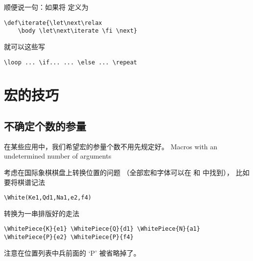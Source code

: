 \documentclass[letterpaper]{book}
\begin{document}
顺便说一句：如果将  定义为
\begin{verbatim}
\def\iterate{\let\next\relax 
    \body \let\next\iterate \fi \next}
\end{verbatim}
就可以这些写
\begin{verbatim}
\loop ... \if... ... \else ... \repeat
\end{verbatim}

\section{宏的技巧}

\subsection{不确定个数的参量}

在某些应用中，我们希望宏的参量个数不用先规定好。
\howto  Macros with an undetermined number
of arguments\par

考虑在国际象棋棋盘上转换位置的问题%
（全部宏和字体可以在 \cite{chess} 和 \cite{Tut} 中找到），
比如要将棋谱记法
\begin{verbatim}
\White(Ke1,Qd1,Na1,e2,f4)
\end{verbatim} 
转换为一串排版好的走法
\begin{verbatim}
\WhitePiece{K}{e1} \WhitePiece{Q}{d1} \WhitePiece{N}{a1} 
\WhitePiece{P}{e2} \WhitePiece{P}{f4}
\end{verbatim}
注意在位置列表中兵前面的 `P' 被省略掉了。
\end{document}
